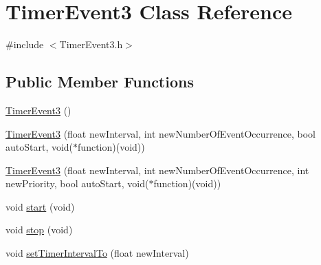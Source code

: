 \hypertarget{class_timer_event3}{
\section{TimerEvent3 Class Reference}
\label{d3/df4/class_timer_event3}
}


{\ttfamily \#include $<$TimerEvent3.h$>$}

\subsection*{Public Member Functions}
\begin{DoxyCompactItemize}
\item 
\hyperlink{class_timer_event3_a740242c0138bd93b66eb60836458f4bf}{TimerEvent3} ()
\item 
\hyperlink{class_timer_event3_a06e50aaab92e499cb161833ef2f131d5}{TimerEvent3} (float newInterval, int newNumberOfEventOccurrence, bool autoStart, void($\ast$function)(void))
\item 
\hyperlink{class_timer_event3_aaf1f3bbec4bbf14f70f4c3848d760c64}{TimerEvent3} (float newInterval, int newNumberOfEventOccurrence, int newPriority, bool autoStart, void($\ast$function)(void))
\item 
void \hyperlink{class_timer_event3_a99e2e191940a7114b192666816ccbc2e}{start} (void)
\item 
void \hyperlink{class_timer_event3_af52f04028de8e391912b41040f29b4fb}{stop} (void)
\item 
void \hyperlink{class_timer_event3_aeed1e12b01f27991f470e41a46bb9f8b}{setTimerIntervalTo} (float newInterval)
\end{DoxyCompactItemize}


